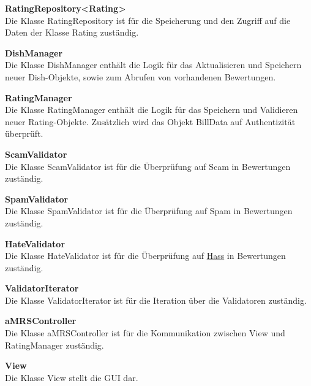 \noindent \textbf{RatingRepository<Rating>}\\
Die Klasse RatingRepository ist für die Speicherung und den Zugriff auf die Daten der Klasse Rating zuständig.
\newline

\noindent \textbf{DishManager}\\
Die Klasse DishManager enthält die Logik für das Aktualisieren und Speichern neuer Dish-Objekte, sowie zum Abrufen von
vorhandenen Bewertungen.
\newline

\noindent \textbf{RatingManager}\\
Die Klasse RatingManager enthält die Logik für das Speichern und Validieren neuer Rating-Objekte. Zusätzlich wird das
Objekt BillData auf Authentizität überprüft.
\newline

\noindent \textbf{ScamValidator}\\
Die Klasse ScamValidator ist für die Überprüfung auf Scam in Bewertungen zuständig.
\newline

\noindent \textbf{SpamValidator}\\
Die Klasse SpamValidator ist für die Überprüfung auf Spam in Bewertungen zuständig.
\newline

\noindent \textbf{HateValidator}\\
Die Klasse HateValidator ist für die Überprüfung auf \hyperref[gls:hass]{Hass} in Bewertungen zuständig.
\newline

\noindent \textbf{ValidatorIterator}\\
Die Klasse ValidatorIterator ist für die Iteration über die Validatoren zuständig.
\newline

\noindent \textbf{aMRSController}\\
Die Klasse aMRSController ist für die Kommunikation zwischen View und RatingManager zuständig.
\newline

\noindent \textbf{View}\\
Die Klasse View stellt die GUI dar.